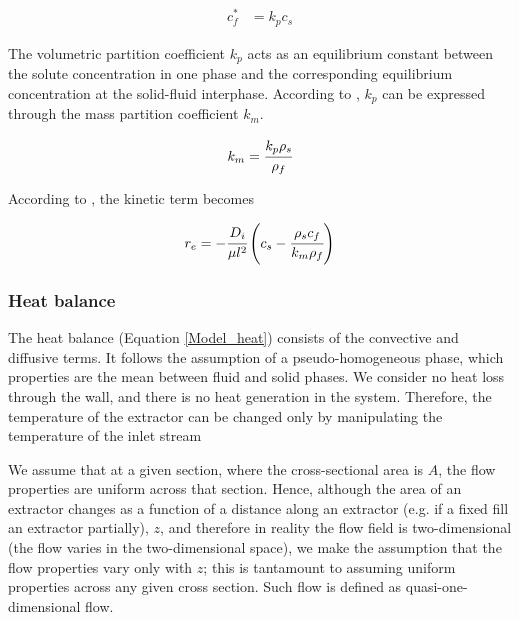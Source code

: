 \documentclass[../Article_Model_Parameters.tex]{subfiles}
\begin{document}
			{\footnotesize
				\begin{align} \label{Linear_equilibirum}
					c_f^* &= k_p c_s
			\end{align} }
			
			The volumetric partition coefficient $k_p$ acts as an equilibrium constant between the solute concentration in one phase and the corresponding equilibrium concentration at the solid-fluid interphase. According to \citet{Spiro2007}, $k_p$ can be expressed through the mass partition coefficient $k_m$.
			
			{\footnotesize
				\begin{align}
					k_m = \cfrac{k_p \rho_s}{\rho_f}
			\end{align} }
			
			According to \citet{Reverchon1996}, the kinetic term becomes
			
			{\footnotesize
				\begin{equation}
					\label{Model_kinetic_no_sat}
					r_e = -\cfrac{D_i}{ \mu l^2 } \left(c_s - \cfrac{\rho_s c_f}{k_m \rho_f} \right)
			\end{equation} }

        
		
		\iffalse	
		\subsubsection{Heat balance} \label{CH: heat_balance}
		
		 {\color{black}
			The heat balance (Equation \ref{Model_heat}) consists of the convective and diffusive terms. It follows the assumption of a pseudo-homogeneous phase, which properties are the mean between fluid and solid phases. We consider no heat loss through the wall, and there is no heat generation in the system. Therefore, the temperature of the extractor can be changed only by manipulating the temperature of the inlet stream %
			
			We assume that at a given section, where the cross-sectional area is $A$, the flow properties are uniform across that section. Hence, although the area of an extractor changes  as a function of a distance along an extractor (e.g. if a fixed fill an extractor partially), $z$, and therefore in reality the flow field is two-dimensional (the flow varies in the two-dimensional space), we make the assumption that the flow properties vary only with $z$; this is tantamount to assuming uniform properties across any given cross section. Such flow is defined as quasi-one-dimensional flow.
			
		}
		
\end{document}
